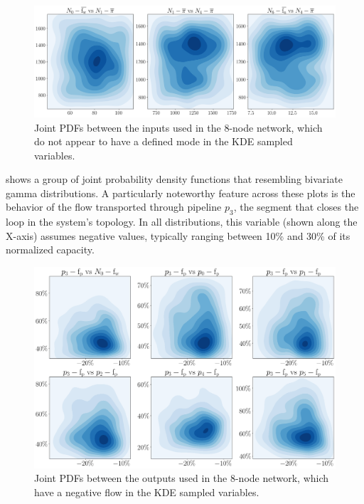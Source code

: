 \begin{figure}[htbp]
    \begin{center}
        \includegraphics[width=.75\textwidth]{figures/Chapter_NonLinealCensnet/PDF_inputs_inputs_no_mode (KDE).png}
    \end{center}
    \caption{Joint PDFs between the inputs used in the 8-node network, which do not appear to have a defined mode in the KDE sampled variables. }
    \label{fig:joint_distributions_input_input_no_mode_KDE}
\end{figure}


 shows a group of joint probability density functions that resembling bivariate gamma distributions. A particularly noteworthy feature across these plots is the behavior of the flow transported through pipeline $p_3$, the segment that closes the loop in the system's topology. In all distributions, this variable (shown along the X-axis) assumes negative values, typically ranging between 10\% and 30\% of its normalized capacity.

\begin{figure}[htbp]
    \begin{center}
        \includegraphics[width=.65\textwidth]{figures/Chapter_NonLinealCensnet/outputs_outputs_2 (KDE).png}
    \end{center}
    \caption{Joint PDFs between the outputs used in the 8-node network, which have a negative flow in the KDE sampled variables.}
    \label{fig:joint_distributions_output_output_2_KDE}
\end{figure}
 

